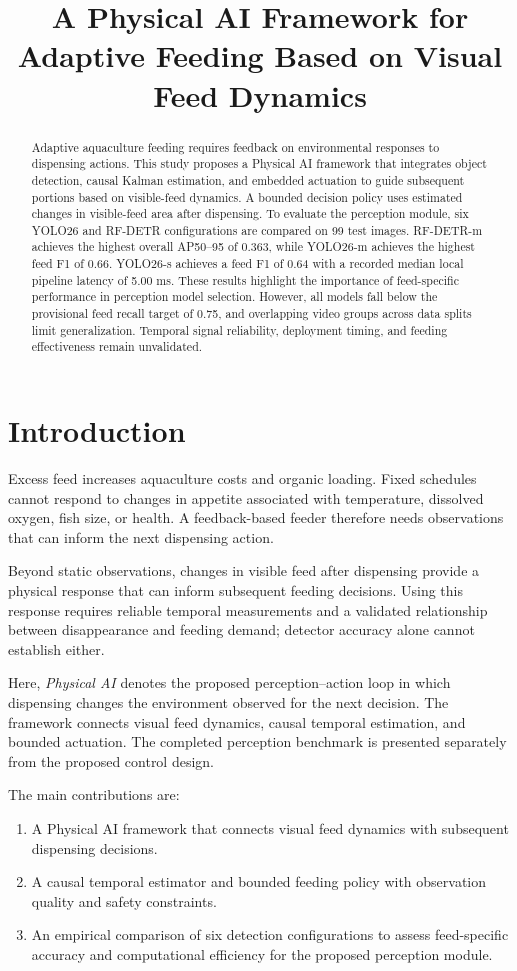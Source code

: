\documentclass[10pt,conference,letterpaper]{IEEEtran}
\title{A Physical AI Framework for Adaptive Feeding Based on Visual Feed Dynamics}
\author{\IEEEauthorblockN{\fontsize{11}{13}\selectfont Sin-Ze Yang, Cheng-Hsun Chuang, Yong-Xiang Chen\textsuperscript{*}}
\IEEEauthorblockA{\fontsize{10}{12}\selectfont\itshape Undergraduate Program in Intelligent Computing and Big Data\\
Chung Yuan Christian University, Taiwan\\
{\fontsize{9}{11}\selectfont\normalfont\ttfamily *Contact: yxchen@cycu.edu.tw}}}
\begin{document}
\maketitle
\begin{abstract}
Adaptive aquaculture feeding requires feedback on environmental responses to dispensing actions. This study proposes a Physical AI framework that integrates object detection, causal Kalman estimation, and embedded actuation to guide subsequent portions based on visible-feed dynamics. A bounded decision policy uses estimated changes in visible-feed area after dispensing. To evaluate the perception module, six YOLO26 and RF-DETR configurations are compared on 99 test images. RF-DETR-m achieves the highest overall AP50--95 of 0.363, while YOLO26-m achieves the highest feed F1 of 0.66. YOLO26-s achieves a feed F1 of 0.64 with a recorded median local pipeline latency of 5.00 ms. These results highlight the importance of feed-specific performance in perception model selection. However, all models fall below the provisional feed recall target of 0.75, and overlapping video groups across data splits limit generalization. Temporal signal reliability, deployment timing, and feeding effectiveness remain unvalidated.
\end{abstract}

\section{Introduction}
Excess feed increases aquaculture costs and organic loading. Fixed schedules cannot respond to changes in appetite associated with temperature, dissolved oxygen, fish size, or health. A feedback-based feeder therefore needs observations that can inform the next dispensing action.

Beyond static observations, changes in visible feed after dispensing provide a physical response that can inform subsequent feeding decisions. Using this response requires reliable temporal measurements and a validated relationship between disappearance and feeding demand; detector accuracy alone cannot establish either.

Here, \emph{Physical AI} denotes the proposed perception--action loop in which dispensing changes the environment observed for the next decision. The framework connects visual feed dynamics, causal temporal estimation, and bounded actuation. The completed perception benchmark is presented separately from the proposed control design.

The main contributions are:
\begin{enumerate}
\setlength{\itemsep}{0pt}
\setlength{\parsep}{0pt}
\setlength{\topsep}{0pt}
\item A Physical AI framework that connects visual feed dynamics with subsequent dispensing decisions.
\item A causal temporal estimator and bounded feeding policy with observation quality and safety constraints.
\item An empirical comparison of six detection configurations to assess feed-specific accuracy and computational efficiency for the proposed perception module.
\end{enumerate}
\end{document}
